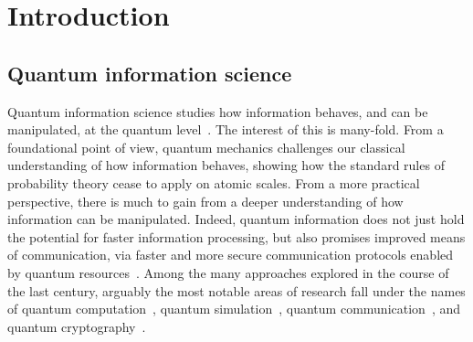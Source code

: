 
\chapter{Introduction}
\label{chapter:introduction}

\section{Quantum information science}

Quantum information science studies how information behaves, and can be manipulated, at the quantum level~\cite{nielsen2006quantum,watrous2018theory}.
The interest of this is many-fold.
From a foundational point of view, quantum mechanics challenges our classical understanding of how information behaves, showing how the standard rules of probability theory cease to apply on atomic scales.
From a more practical perspective, there is much to gain from a deeper understanding of how information can be manipulated.
Indeed, quantum information does not just hold the potential for faster information processing, but also promises improved means of communication, via faster and more secure communication protocols enabled by quantum resources~\cite{gisin2002quantum,krenn2016quantum,pirandola2019advances}.
Among the many approaches explored in the course of the last century, arguably the most notable areas of research fall under the names of quantum computation~\cite{shor1997polynomial,steane1998quantum,ladd2010quantum,wolf2019quantum}, quantum simulation~\cite{lloyd1996universal,georgescu2014quantum,koch2019quantum}, quantum communication~\cite{bennett1993teleporting}, and quantum cryptography~\cite{bennett2014quantum}.


